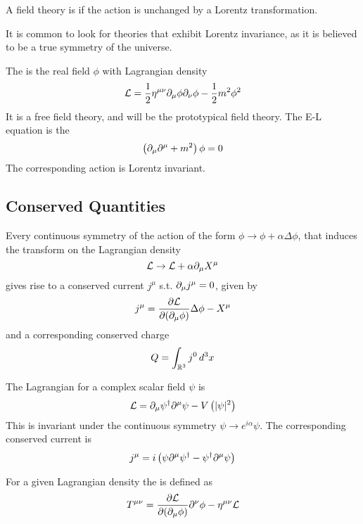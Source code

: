 \documentclass{article}
\begin{document}
\begin{definition}
A field theory is  if the action is unchanged by a Lorentz transformation. 
\end{definition}

\begin{idea}
It is common to look for theories that exhibit Lorentz invariance, as it is believed to be a true symmetry of the universe.
\end{idea}

\begin{definition}
The  is the real field $\phi$ with Lagrangian density
\[
\mc{L}=\frac{1}{2}\eta^{\mu\nu} \del_\mu\phi \del_\nu\phi-\frac{1}{2}m^2\phi^2
\]
It is a free field theory, and will be the prototypical field theory. The E-L equation is the 
\[
\left( \del_\mu \del^\mu + m^2 \right)\phi=0
\]
The corresponding action is Lorentz invariant. 
\end{definition}


\subsection{Conserved Quantities}

\begin{theorem}
Every continuous symmetry of the action of the form $\phi\to\phi+\alpha\Delta\phi$, that induces the transform on the Lagrangian density 
\[
\mc{L} \to \mc{L}+\alpha \del_\mu X^\mu
\]
gives rise to a conserved current $j^\mu$ s.t. $\del_\mu j^\mu = 0$, given by
\[
j^\mu = \pd[\mc{L}]{(\del_\mu \phi)}\Delta\phi-X^\mu
\]
and a corresponding conserved charge
\[
Q=\int_{\mbb{R}^3} j^0 \, d^3x
\]
\end{theorem}

\begin{example}
The Lagrangian for a complex scalar field $\psi$ is 
\[
\mc{L}=\del_\mu \psi^\dagger \del^\mu \psi - V\left(|\psi|^2\right)
\]
This is invariant under the continuous symmetry $\psi \to e^{i\alpha}\psi$. The corresponding conserved current is 
\[
j^\mu=i\left( \psi\del^\mu\psi^\dagger-\psi^\dagger\del^\mu\psi \right)
\]
\end{example}

\begin{definition}
For a given Lagrangian density the  is defined as  
\[
T^{\mu\nu}=\pd[\mc{L}]{(\del_\mu \phi)} \del^\nu \phi - \eta^{\mu\nu}\mc{L}
\]
\end{definition}
\end{document}
